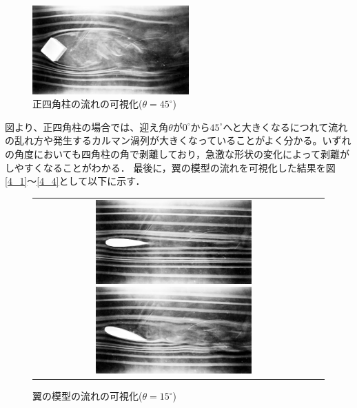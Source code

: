 \documentclass[a4paper,11pt,uplatex]{jsarticle}
\begin{document}
\begin{figure}[H]
  \begin{center}
    \includegraphics[width = 6cm]{pic/006.jpg}
    \caption{正四角柱の流れの可視化($\theta = 45 ^{\circ}$)}
    \label{3_3}
  \end{center}
\end{figure}

図より、正四角柱の場合では、迎え角$\theta$が$0^\circ$から$45^\circ$へと大きくなるにつれて流れの乱れ方や発生するカルマン渦列が大きくなっていることがよく分かる。いずれの角度においても四角柱の角で剥離しており，急激な形状の変化によって剥離がしやすくなることがわかる．
最後に，翼の模型の流れを可視化した結果を図\ref{4_1}〜\ref{4_4}として以下に示す．

\begin{figure}[H]
  \begin{tabular}{cc}
    \begin{minipage}{0.5\hsize}
      \centering
      \includegraphics[width = 6cm]{pic/007.jpg}
      \caption{翼の模型の流れの可視化($\theta = 0 ^{\circ}$)}
      \label{4_1}
    \end{minipage}

    \begin{minipage}{0.5\hsize}
      \centering
      \includegraphics[width = 6cm]{pic/008.jpg}
      \caption{翼の模型の流れの可視化($\theta = 15 ^{\circ}$)}
      \label{4_2}
    \end{minipage}
  \end{tabular}
\end{figure}
\end{document}
